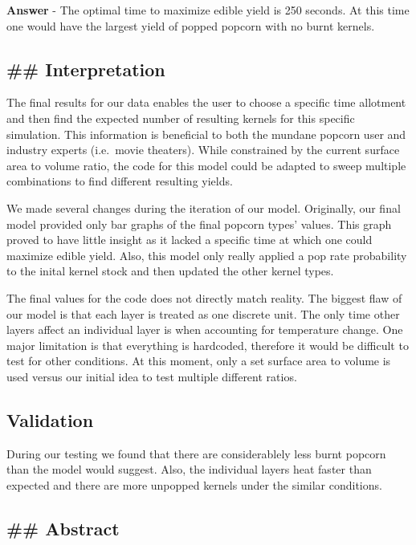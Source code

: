\documentclass[11pt]{article}
\begin{document}
\textbf{Answer} - The optimal time to maximize edible yield is 250
seconds. At this time one would have the largest yield of popped popcorn
with no burnt kernels.

    \hypertarget{interpretation}{%
\subsection{\#\# Interpretation}\label{interpretation}}

    The final results for our data enables the user to choose a specific
time allotment and then find the expected number of resulting kernels
for this specific simulation. This information is beneficial to both the
mundane popcorn user and industry experts (i.e.~movie theaters). While
constrained by the current surface area to volume ratio, the code for
this model could be adapted to sweep multiple combinations to find
different resulting yields.

We made several changes during the iteration of our model. Originally,
our final model provided only bar graphs of the final popcorn types'
values. This graph proved to have little insight as it lacked a specific
time at which one could maximize edible yield. Also, this model only
really applied a pop rate probability to the inital kernel stock and
then updated the other kernel types.

The final values for the code does not directly match reality. The
biggest flaw of our model is that each layer is treated as one discrete
unit. The only time other layers affect an individual layer is when
accounting for temperature change. One major limitation is that
everything is hardcoded, therefore it would be difficult to test for
other conditions. At this moment, only a set surface area to volume is
used versus our initial idea to test multiple different ratios.

    \hypertarget{validation}{%
\subsection{Validation}\label{validation}}

    During our testing we found that there are considerablely less burnt
popcorn than the model would suggest. Also, the individual layers heat
faster than expected and there are more unpopped kernels under the
similar conditions.

    \hypertarget{abstract}{%
\subsection{\#\# Abstract}\label{abstract}}
\end{document}

